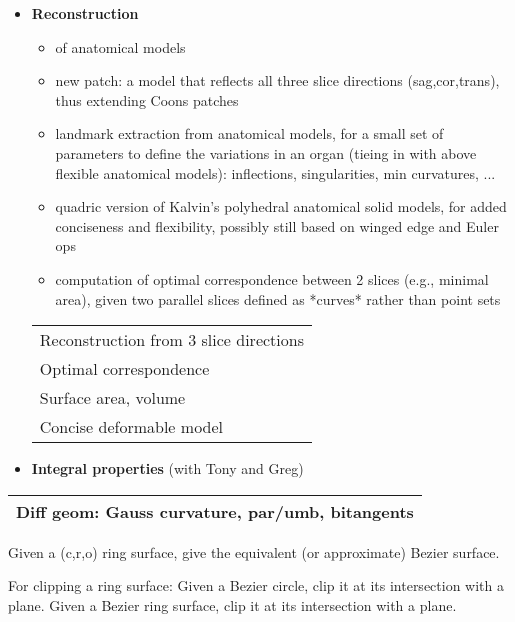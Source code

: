 \begin{itemize}
\clearpage

\item
{\bf Reconstruction}
\begin{itemize}
\item of anatomical models
\item new patch: a model that reflects all three slice directions 
	(sag,cor,trans), thus extending Coons patches
\item landmark extraction from anatomical models, for a small set
	of parameters to define the variations in an organ
	(tieing in with above flexible anatomical models):
	inflections, singularities, min curvatures, ...
\item quadric version of Kalvin's polyhedral anatomical solid models,
	for added conciseness and flexibility,
	possibly still based on winged edge and Euler ops 
\item computation of optimal correspondence between 2 slices
	(e.g., minimal area), given two parallel slices defined 
	as *curves* rather than point sets
\end{itemize}

\begin{table}[h]
\centering
\begin{tabular}{|l|}
%
\hline
Reconstruction from 3 slice directions \\
Optimal correspondence \\  %
Surface area, volume \\ %
Concise deformable model \\
\hline
\end{tabular}
\end{table}

\item
{\bf Integral properties} (with Tony and Greg)
\end{itemize}

\begin{table}[h]
\centering
\begin{tabular}{|l|}
%
\hline
Diff geom: Gauss curvature, par/umb, bitangents \\
\hline
\end{tabular}
\end{table}

\clearpage



Given a (c,r,o) ring surface, give the equivalent (or approximate)
Bezier surface.

For clipping a ring surface:
Given a Bezier circle, clip it at its intersection with a plane.
Given a Bezier ring surface, clip it at its intersection with a plane.

